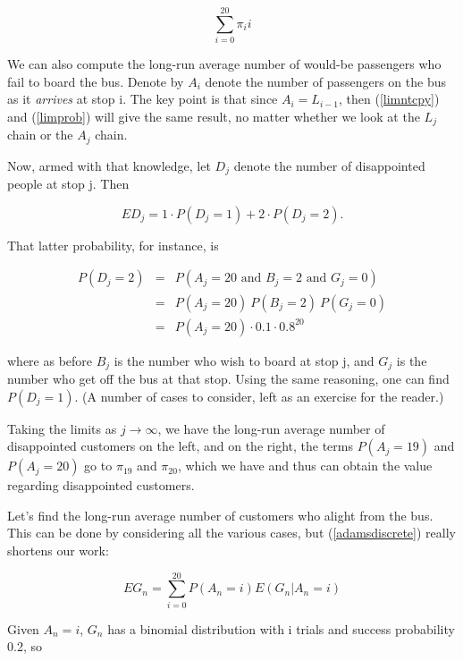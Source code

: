 \begin{equation}
\label{avgonbus}
\sum_{i=0}^{20} \pi_i i
\end{equation}

We can also compute the long-run average number of would-be passengers who
fail to board the bus.  Denote by $A_i$ denote the number of passengers
on the bus as it {\it arrives} at stop i. The key point is that since
$A_i = L_{i-1}$, then (\ref{limntcpy}) and (\ref{limprob}) will give the
same result, no matter whether we look at the $L_j$ chain or the $A_j$ chain.

Now, armed with that knowledge, let $D_j$ denote the number of
disappointed people at stop j.  Then

\begin{equation}
ED_j = 1 \cdot P(D_j = 1) + 2 \cdot P(D_j = 2).
\end{equation}

That latter probability, for instance, is

\begin{eqnarray}
P(D_j = 2) 
&=& 
P(A_j = 20 \textrm{ and } B_j = 2 \textrm{ and } G_j = 0) \\ 
&=& P(A_j = 20) ~ P(B_j = 2) ~ P(G_j = 0) \\
&=& P(A_j = 20) \cdot 0.1 \cdot 0.8^{20}
\end{eqnarray}

where as before $B_j$ is the number who wish to board at stop j, and
$G_j$ is the number who get off the bus at that stop.  Using the same
reasoning, one can find $P(D_j = 1)$. (A number of cases to consider,
left as an exercise for the reader.)

Taking the limits as $j \rightarrow \infty$, we have the long-run
average number of disappointed customers on the left, and on the right,
the terms $P(A_j = 19)$ and $P(A_j = 20)$ go to $\pi_{19}$ and
$\pi_{20}$, which we have and thus can obtain the value regarding
disappointed customers.

Let's find the long-run average number of customers who alight from the
bus.  This can be done by considering all the various cases, but
(\ref{adamsdiscrete}) really shortens our work:  

\begin{equation}
\label{eunan}
EG_n = \sum_{i=0}^{20} P(A_n = i) E(G_n | A_n = i)
\end{equation}

Given $A_n = i$, $G_n$ has a binomial distribution with i trials and
success probability 0.2, so 

